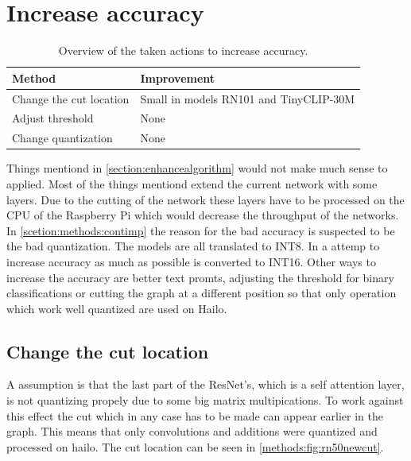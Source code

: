 \section{Increase accuracy}

\begin{table}[h!]
    \centering
    \begin{tabular}{l|l}
        \hline
     Method &  Improvement\\
     \hline
     Change the cut location &  Small in models RN101 and TinyCLIP-30M\\
     Adjust threshold &  None\\
     Change quantization & None
    \end{tabular}
    \caption{Overview of the taken actions to increase accuracy.}
    \label{methods:tab:prefOverview}
\end{table}

Things mentiond in \cref{section:enhancealgorithm} would not make much sense to applied.
Most of the things mentiond extend the current network with some layers.
Due to the cutting of the network these layers have to be processed on the CPU of the Raspberry Pi which would decrease the throughput of the networks.
In \cref{scetion:methods:contimp} the reason for the bad accuracy is suspected to be the bad quantization.
The models are all translated to INT8.
In a attemp to increase accuracy as much as possible is converted to INT16.
Other ways to increase the accuracy are better text promts, adjusting the threshold for binary classifications or cutting the graph at a different position so that only operation which work well quantized are used on Hailo.

\subsection{Change the cut location
\label{methods:sec:cutlocation}}
A assumption is that the last part of the ResNet's, which is a self attention layer, is not quantizing propely due to some big matrix multipications.
To work against this effect the cut which in any case has to be made can appear earlier in the graph.
This means that only convolutions and additions were quantized and processed on hailo.
The cut location can be seen in \cref{methods:fig:rn50newcut}.


